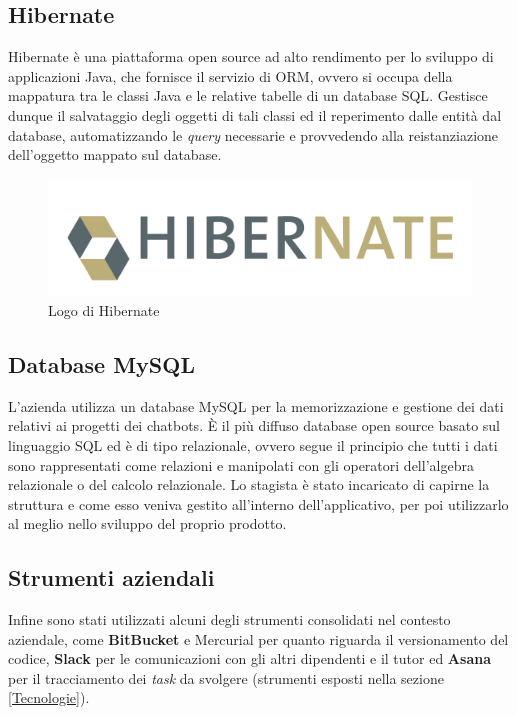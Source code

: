 \subsection{Hibernate}
Hibernate è una piattaforma \gls{open source} ad alto rendimento per lo sviluppo di applicazioni Java, che fornisce il servizio di \gls{ORM}, ovvero si occupa della mappatura tra le classi Java e le relative tabelle di un database \gls{SQL}.
Gestisce dunque il salvataggio degli oggetti di tali classi ed il reperimento dalle entità dal database, automatizzando le \emph{query} necessarie e provvedendo alla reistanziazione dell’oggetto mappato sul database.
\begin{figure}[h]
	\centering
	\includegraphics[scale=0.35]{../Immagini/Hibernate.png}
	\caption{Logo di Hibernate}
\end{figure}

\subsection{Database MySQL} 
L'azienda \azienda{} utilizza un database MySQL per la memorizzazione e gestione dei dati relativi ai progetti dei \glspl{chatbot}. È il più diffuso database \gls{open source} basato sul linguaggio \gls{SQL} ed è di tipo relazionale, ovvero segue il principio che tutti i dati sono rappresentati come relazioni e manipolati con gli operatori dell’algebra relazionale o del calcolo relazionale.
Lo stagista è stato incaricato di capirne la struttura e come esso veniva gestito all'interno dell'applicativo, per poi utilizzarlo al meglio nello sviluppo del proprio prodotto.\\

\subsection{Strumenti aziendali}
Infine sono stati utilizzati alcuni degli strumenti consolidati nel contesto aziendale, come \textbf{BitBucket} e \gls{Mercurial} per quanto riguarda il versionamento del codice, \textbf{Slack} per le comunicazioni con gli altri dipendenti e il tutor ed \textbf{Asana} per il tracciamento dei \emph{task} da svolgere (strumenti esposti nella sezione \ref{Tecnologie}).



